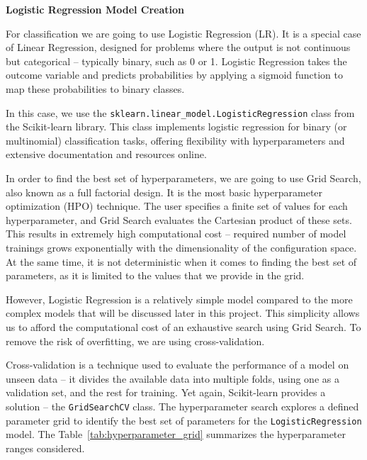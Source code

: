 \vspace{3mm} 

\textbf{\large Logistic Regression Model Creation}

\vspace{3mm}

For classification we are going to use Logistic Regression (LR). It is a special case of Linear Regression, designed for problems where the output is not continuous but categorical -- typically binary, such as 0 or 1. Logistic Regression takes the outcome variable and predicts probabilities by applying a sigmoid function to map these probabilities to binary classes.

\vspace{3mm} 

In this case, we use the \texttt{sklearn.linear\_model.LogisticRegression} class from the Scikit-learn library. This class implements logistic regression for binary (or multinomial) classification tasks, offering flexibility with hyperparameters and extensive documentation and resources online.

\vspace{3mm} 

In order to find the best set of hyperparameters, we are going to use Grid Search, also known as a full factorial design. It is the most basic hyperparameter optimization (HPO) technique. The user specifies a finite set of values for each hyperparameter, and Grid Search evaluates the Cartesian product of these sets. This results in extremely high computational cost -- required number of model trainings grows exponentially with the  dimensionality of the configuration space. At the same time, it is not deterministic when it comes to finding the best set of parameters, as it is limited to the values that we provide in the grid. 

\vspace{3mm} 

However, Logistic Regression is a relatively simple model compared to the more complex models that will be discussed later in this project. This simplicity allows us to afford the computational cost of an exhaustive search using Grid Search. To remove the risk of overfitting, we are using cross-validation. 

\vspace{3mm} 

Cross-validation is a technique used to evaluate the performance of a model on unseen data -- it divides the available data into multiple folds, using one as a validation set, and the rest for training. Yet again, Scikit-learn provides a solution -- the \texttt{GridSearchCV} class. The hyperparameter search explores a defined parameter grid to identify the best set of parameters for the \texttt{LogisticRegression} model. The Table~\ref{tab:hyperparameter_grid} summarizes the hyperparameter ranges considered.

